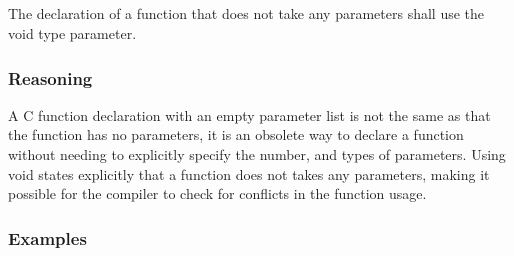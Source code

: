 \subsection*{\myRule{}}

The declaration of a function that does not take any parameters shall use the void type parameter.

\subsubsection*{Reasoning}

A C function declaration with an empty parameter list is not the same as that the function has no parameters, it is an obsolete way to declare a function without needing to explicitly specify the number, and types of parameters. Using void states explicitly that a function does not takes any parameters, making it possible for the compiler to check for conflicts in the function usage.

\subsubsection*{Examples}

\begin{minipage}[t]{0.47\linewidth}

\end{minipage}
\hfill
\begin{minipage}[t]{0.47\linewidth}

\end{minipage}
